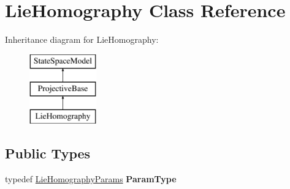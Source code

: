 \hypertarget{classLieHomography}{\section{Lie\-Homography Class Reference}
\label{classLieHomography}
}
Inheritance diagram for Lie\-Homography\-:\begin{figure}[H]
\begin{center}
\leavevmode
\includegraphics[height=3.000000cm]{classLieHomography}
\end{center}
\end{figure}
\subsection*{Public Types}
\begin{DoxyCompactItemize}
\item 
\hypertarget{classLieHomography_afbeb5fbe72e4158bb822d91e87298d13}{typedef \hyperlink{structLieHomographyParams}{Lie\-Homography\-Params} {\bfseries Param\-Type}}\label{classLieHomography_afbeb5fbe72e4158bb822d91e87298d13}

\end{DoxyCompactItemize}
